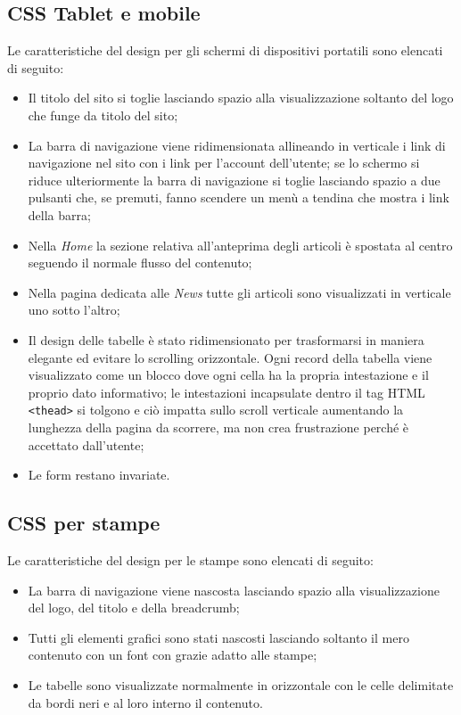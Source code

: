     \subsection{CSS Tablet e mobile}
    Le caratteristiche del design per gli schermi di dispositivi portatili sono elencati di seguito:
    \begin{itemize}
        \item Il titolo del sito si toglie lasciando spazio alla visualizzazione soltanto del logo che funge da titolo del sito;
        \item La barra di navigazione viene ridimensionata allineando in verticale i link di navigazione nel sito con i link per l'account dell'utente; se lo schermo si riduce ulteriormente la barra di navigazione si toglie lasciando spazio a due pulsanti che, se premuti, fanno scendere un menù a tendina che mostra i link della barra;
        \item Nella \textit{Home} la sezione relativa all'anteprima degli articoli è spostata al centro seguendo il normale flusso del contenuto;
        \item Nella pagina dedicata alle \textit{News} tutte gli articoli sono visualizzati in verticale uno sotto l'altro;
        \item Il design delle tabelle è stato ridimensionato per trasformarsi in maniera elegante ed evitare lo scrolling orizzontale. Ogni record della tabella viene visualizzato come un blocco dove ogni cella ha la propria intestazione e il proprio dato informativo; le intestazioni incapsulate dentro il tag HTML \texttt{<thead>} si tolgono e ciò impatta sullo scroll verticale aumentando la lunghezza della pagina da scorrere, ma non crea frustrazione perché è accettato dall'utente;
        \item Le form restano invariate.
    \end{itemize}
    
    \subsection{CSS per stampe}
    Le caratteristiche del design per le stampe sono elencati di seguito:
    \begin{itemize}
        \item La barra di navigazione viene nascosta lasciando spazio alla visualizzazione del logo, del titolo e della breadcrumb;
        \item Tutti gli elementi grafici sono stati nascosti lasciando soltanto il mero contenuto con un font con grazie adatto alle stampe;
        \item Le tabelle sono visualizzate normalmente in orizzontale con le celle delimitate da bordi neri e al loro interno il contenuto.
    \end{itemize}